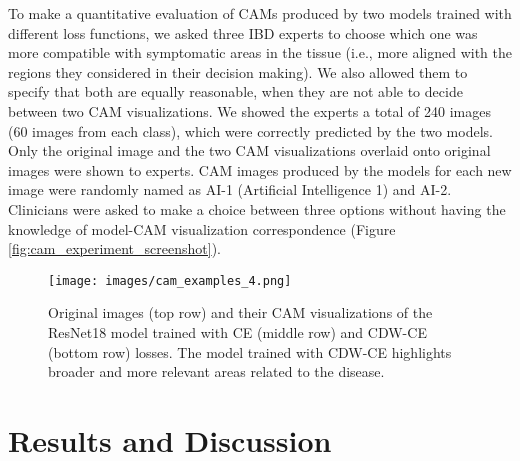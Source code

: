 \documentclass[runningheads]{llncs}
\begin{document}
To make a quantitative evaluation of CAMs produced by two models trained with different loss functions, we asked three IBD experts to choose which one was more compatible with symptomatic areas in the tissue (i.e., more aligned with the regions they considered in their decision making). We also allowed them to specify that both are equally reasonable, when they are not able to decide between two CAM visualizations. We showed the experts a total of 240 images (60 images from each class), which were correctly predicted by the two models. Only the original image and the two CAM visualizations overlaid onto original images were shown to experts. CAM images produced by the models for each new image were randomly named as AI-1 (Artificial Intelligence 1) and AI-2. Clinicians were asked to make a choice between three options without having the knowledge of model-CAM visualization correspondence (Figure \ref{fig:cam_experiment_screenshot}).  

\begin{figure}[t!]
  \centering
  \texttt{[image: images/cam\_examples\_4.png]}
  \caption{Original images (top row) and their CAM visualizations of the ResNet18 model trained with CE (middle row) and CDW-CE (bottom row) losses. The model trained with CDW-CE highlights broader and more relevant areas related to the disease.}
  \label{fig:cam_examples}
\end{figure}


\section{Results and Discussion}
\end{document}
